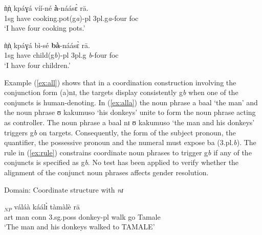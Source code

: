 \begin{exe}
\begin{exe}
\begin{exe}
{\begin{exe}
\begin{exe}
\begin{exe}
\begin{exe}
\begin{exe}
\begin{exe}
\begin{exe}
\begin{exe}
\begin{exe}
\begin{exe}
\begin{exe}
\begin{exe}
\begin{exe}
\begin{exe}
\begin{exe}
\begin{exe}
\begin{exe}
\begin{exe}
\begin{exe}
\ex\label{ex:domnumI}

\gll  ǹ̩ǹ̩  kpáɣá  víí-né   \textbf{à}-náásɛ̀ rā.\\
  {\sc 1sg}  {have}  {cooking.pot({\sc g}{\it a})-{\sc pl}}   {{\sc
3pl.g}{\it a}-four}  {\sc foc}\\
\glt `I have four cooking pots.'\\



\ex\label{ex:domnumH+}

\gll  ǹ̩ǹ̩   kpáɣá  bì-sé  \textbf{bà}-náásɛ̀  rā.\\
  {\sc 1sg}  {have}  {child({\sc g}{\it b})-{\sc pl}}   {{\sc 3pl.g}{\it
b}-four}  {\sc foc}\\
\glt `I have four children.'\\



\z 
 \z



Example (\ref{ex:all}) shows that in a coordination construction
involving the conjunction form {\sls (a)nɪ},  the targets display
consistently {\sc g}{\it b} when one of the conjuncts is
human-denoting.  In (\ref{ex:alla}) the noun
phrase {\sls a baal} `the man' and the noun phrase
 {\sls ʊ  kakumuso} `his donkeys' unite to form the noun
phrase acting as controller.  The noun phrase  {\sls a
 baal nɪ ʊ kakumuso} `the man and his
donkeys' triggers {\sc g}{\it b} on targets.  Consequently, the
form of the subject pronoun, the quantifier, the possessive pronoun
and the numeral must expose  {\sls ba} ({\sc 3.pl.}{\it b}).
The rule in (\ref{ex:rule}) constrains coordinate noun phrases to
trigger {\sc g}{\it b} if any of the conjuncts is specified as
{\sc g}{\it b}. No test has been applied to verify whether the
alignment of the conjunct noun phrases affects gender
resolution.






\ea\label{ex:all}{\rm Domain: Coordinate structure with {\it nɪ}}\\


\ea\label{ex:alla}

\gll  [à  báál   nɪ̀  ʊ̀ʊ̀  kààkúmò-sō]$_{NP}$  váláà  káálɪ̀  
tàmàlè
rā
\\
   {\sc art} {man} {\sc conn}  {\sc 3.sg.poss} {donkey-{\sc pl}} {walk}  {go}
{Tamale} {\foc}\\
\glt `The man and his donkeys walked to TAMALE'\\


\end{exe}
\end{exe}
\end{exe}
\end{exe}
\end{exe}
\end{exe}
\end{exe}
\end{exe}
\end{exe}
\end{exe}
\end{exe}
\end{exe}
\end{exe}
\end{exe}
\end{exe}
\end{exe}
\end{exe}
\end{exe}
\end{exe}}
\end{exe}
\end{exe}
\end{exe}
